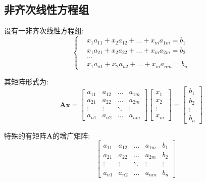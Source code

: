 \subsection{非齐次线性方程组}
设有一非齐次线性方程组:
\begin{equation*}
\left\{
\begin{aligned}
& x_{1}a_{11}+x_{2}a_{12}+...+x_{m}a_{1m}=b_{1} \\
& x_{1}a_{21}+x_{2}a_{22}+...+x_{m}a_{2m}=b_{2} \\
& \dots \\
& x_{1}a_{n1}+x_{2}a_{n2}+...+x_{m}a_{nm}=b_{n}
\end{aligned}
\right.
\end{equation*}\par
其矩阵形式为:
\begin{equation*}
\bm{A}\bm{x}=
\begin{bmatrix}
a_{11} & a_{12} & \dots & a_{1m} \\
a_{21} & a_{22} & \dots & a_{2m} \\
\vdots & \vdots & \ddots & \vdots \\
a_{n1} & a_{n2} & \dots & a_{nm}
\end{bmatrix}
\begin{bmatrix}
x_{1} \\
x_{2} \\
\vdots \\
x_{m}
\end{bmatrix}=
\begin{bmatrix}
b_{1} \\
b_{2} \\
\vdots \\
b_{n}
\end{bmatrix}
\end{equation*}\par
特殊的有矩阵$ \bm{A} $的增广矩阵:
\begin{equation*}
[\bm{A},\bm{b}]=
\begin{bmatrix}
a_{11} & a_{12} & \dots & a_{1m} & b_{1} \\
a_{21} & a_{22} & \dots & a_{2m} & b_{2} \\
\vdots & \vdots & \ddots & \vdots & \vdots \\
a_{n1} & a_{n2} & \dots & a_{nm} & b_{n}
\end{bmatrix}
\end{equation*}
